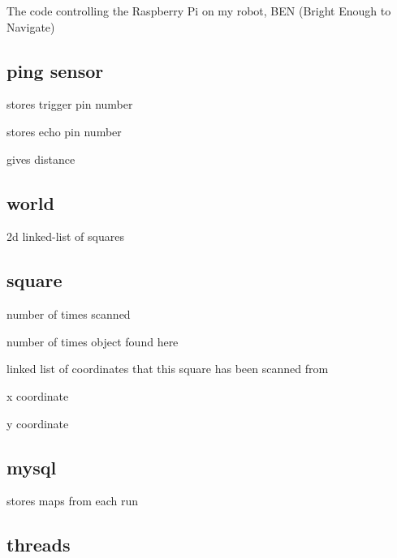 The code controlling the Raspberry Pi on my robot, B\-E\-N (Bright Enough to Navigate)

\subsection*{ping sensor}


\begin{DoxyItemize}
\item stores trigger pin number
\item stores echo pin number
\item gives distance
\end{DoxyItemize}

\subsection*{world}


\begin{DoxyItemize}
\item 2d linked-\/list of squares
\end{DoxyItemize}

\subsection*{square}


\begin{DoxyItemize}
\item number of times scanned
\item number of times object found here
\item linked list of coordinates that this square has been scanned from
\item x coordinate
\item y coordinate
\end{DoxyItemize}

\subsection*{mysql}


\begin{DoxyItemize}
\item stores maps from each run
\end{DoxyItemize}

\subsection*{threads}

